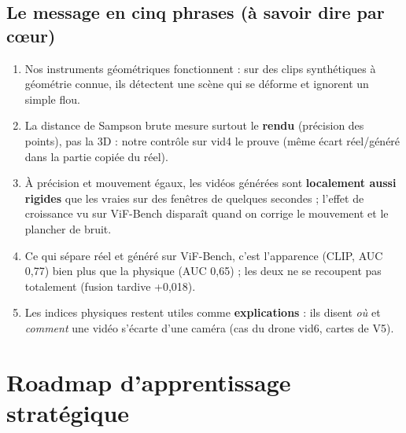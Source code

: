 \documentclass[11pt,a4paper]{article}
\begin{document}
\subsection{Le message en cinq phrases (à savoir dire par cœur)}
\begin{enumerate}
  \item Nos instruments géométriques fonctionnent : sur des clips synthétiques à géométrie connue,
        ils détectent une scène qui se déforme et ignorent un simple flou.
  \item La distance de Sampson brute mesure surtout le \textbf{rendu} (précision des points), pas la
        3D : notre contrôle sur vid4 le prouve (même écart réel/généré dans la partie copiée du réel).
  \item À précision et mouvement égaux, les vidéos générées sont \textbf{localement aussi rigides}
        que les vraies sur des fenêtres de quelques secondes ; l'effet de \og croissance \fg{} vu
        sur ViF-Bench disparaît quand on corrige le mouvement et le plancher de bruit.
  \item Ce qui sépare réel et généré sur ViF-Bench, c'est l'apparence (CLIP, AUC 0,77) bien plus
        que la physique (AUC 0,65) ; les deux ne se recoupent pas totalement (fusion tardive +0,018).
  \item Les indices physiques restent utiles comme \textbf{explications} : ils disent \emph{où} et
        \emph{comment} une vidéo s'écarte d'une caméra (cas du drone vid6, cartes de V5).
\end{enumerate}

\section{Roadmap d'apprentissage stratégique}
\end{document}
